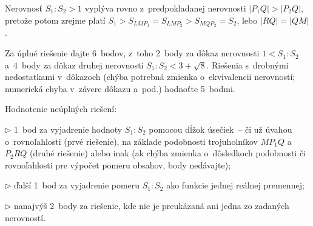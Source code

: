 {\poznamka
Nerovnosť $S_1 : S_2>1$ vyplýva rovno z~predpokladanej nerovnosti
$|P_1 Q| > |P_2 Q|$, pretože potom zrejme platí
$S_1>S_{LMP_1}=S_{LMP_2}>S_{MQP_2}=S_2$, lebo $|RQ|=|QM|$.

\nobreak\medskip\petit\noindent
Za úplné riešenie dajte 6~bodov, z~toho 2~body za dôkaz nerovnosti $1 <
S_1: S_2$ a~4~body za dôkaz druhej nerovnosti $S_1: S_2 <3+ \sqrt {8}$.
Riešenia s~drobnými nedostatkami v~dôkazoch (chýba potrebná zmienka
o~ekvivalencii nerovností; numerická chyba v~závere dôkazu a~pod.)
hodnoťte 5~bodmi.

Hodnotenie neúplných riešení:
\item{$\triangleright$} 1~bod za vyjadrenie hodnoty $S_1: S_2$ pomocou dĺžok úsečiek~--
či už úvahou o~rovnoľahlosti (prvé riešenie), na základe podobnosti
trojuholníkov $MP_1Q$ a~$P_2RQ$ (druhé riešenie) alebo inak (ak chýba
zmienka o~dôsledkoch podobnosti či rovnoľahlosti pre výpočet pomeru
obsahov, body nedávajte);
\item{$\triangleright$} ďalší 1~bod za vyjadrenie pomeru $S_1: S_2$ ako funkcie jednej
reálnej premennej;
\item{$\triangleright$} nanajvýš 2~body za riešenie, kde nie je preukázaná ani jedna zo
zadaných nerovností.

\endpetit
\bigbreak
}

